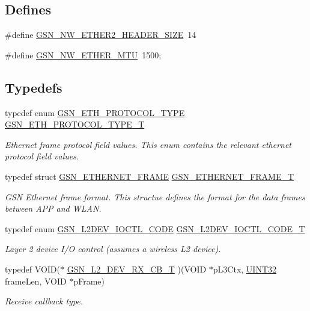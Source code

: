 \subsection*{Defines}
\begin{DoxyCompactItemize}
\item 
\#define \hyperlink{a00533_a44848f957b5ff584fc8df72c554e9283}{GSN\_\-NW\_\-ETHER2\_\-HEADER\_\-SIZE}~14
\item 
\#define \hyperlink{a00533_a8909f0df52e224e9ffd677ca79cf88e5}{GSN\_\-NW\_\-ETHER\_\-MTU}~1500;
\end{DoxyCompactItemize}
\subsection*{Typedefs}
\begin{DoxyCompactItemize}
\item 
typedef enum \hyperlink{a00670_ga5be81e41aa75406c2f3b778aa073e052}{GSN\_\-ETH\_\-PROTOCOL\_\-TYPE} \hyperlink{a00670_ga0144cadb46845e8150cdf57ae4a57ca5}{GSN\_\-ETH\_\-PROTOCOL\_\-TYPE\_\-T}
\begin{DoxyCompactList}\small\item\em Ethernet frame protocol field values. This enum contains the relevant ethernet protocol field values. \end{DoxyCompactList}\item 
typedef struct \hyperlink{a00068}{GSN\_\-ETHERNET\_\-FRAME} \hyperlink{a00670_ga4c2283c8c30055ade4fd96a34a9110aa}{GSN\_\-ETHERNET\_\-FRAME\_\-T}
\begin{DoxyCompactList}\small\item\em GSN Ethernet frame format. This structue defines the format for the data frames between APP and WLAN. \end{DoxyCompactList}\item 
typedef enum \hyperlink{a00670_ga8d699f24bea4c9cf889e2cd1e854d06e}{GSN\_\-L2DEV\_\-IOCTL\_\-CODE} \hyperlink{a00670_ga462b6ae25d126945eeb2bc9743ca3288}{GSN\_\-L2DEV\_\-IOCTL\_\-CODE\_\-T}
\begin{DoxyCompactList}\small\item\em Layer 2 device I/O control (assumes a wireless L2 device). \end{DoxyCompactList}\item 
typedef VOID($\ast$ \hyperlink{a00670_ga528d617c85be4b1aed82ce677f941587}{GSN\_\-L2\_\-DEV\_\-RX\_\-CB\_\-T} )(VOID $\ast$pL3Ctx, \hyperlink{a00660_gae1e6edbbc26d6fbc71a90190d0266018}{UINT32} frameLen, VOID $\ast$pFrame)
\begin{DoxyCompactList}\small\item\em Receive callback type. \end{DoxyCompactList}\item 

\end{DoxyCompactItemize}
